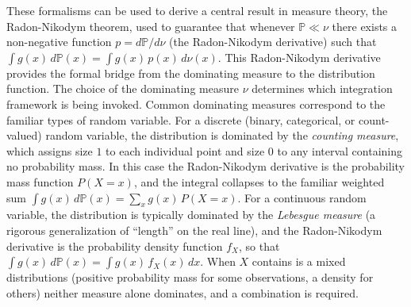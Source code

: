 \documentclass[12pt]{article}
\numberwithin{equation}{section}
\begin{document}
These formalisms can be used to derive a central result in measure theory, the Radon-Nikodym theorem, used to guarantee that whenever $\mathbb{P} \ll \nu$ there exists a non-negative function $p = d\mathbb{P}/d\nu$ (the Radon-Nikodym derivative) such that $\int g(x)\,d\mathbb{P}(x) = \int g(x)\,p(x)\,d\nu(x)$. This Radon-Nikodym derivative provides the formal bridge from the dominating measure to the distribution function. The choice of the dominating measure $\nu$ determines which integration framework is being invoked. Common dominating measures correspond to the familiar types of random variable. For a discrete (binary, categorical, or count-valued) random variable, the distribution is dominated by the \emph{counting measure}, which assigns size $1$ to each individual point and size $0$ to any interval containing no probability mass. In this case the Radon-Nikodym derivative is the probability mass function $P(X=x)$, and the integral collapses to the familiar weighted sum $\int g(x)\,d\mathbb{P}(x) = \sum_x g(x)\,P(X=x)$. For a continuous random variable, the distribution is typically dominated by the \emph{Lebesgue measure} (a rigorous generalization of ``length'' on the real line), and the Radon-Nikodym derivative is the probability density function $f_X$, so that $\int g(x)\,d\mathbb{P}(x) = \int g(x)\,f_X(x)\,dx$. When $X$ contains is a mixed distributions (positive probability mass for some observations, a density for others) neither measure alone dominates, and a combination is required. 
\end{document}
